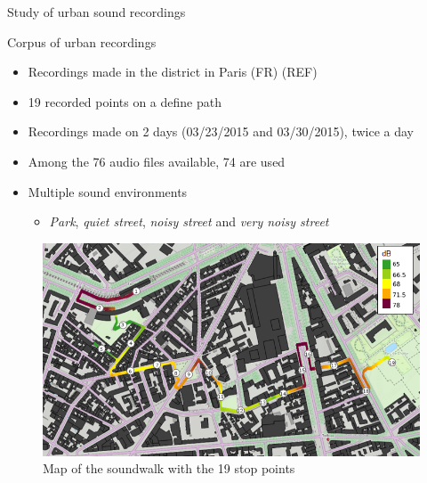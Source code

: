 \documentclass{beamer}
\begin{document}
\begin{frame}{Study of urban sound recordings}

\begin{block}{Corpus of urban recordings}
\begin{itemize}
	 \item Recordings made in the  district in Paris (FR) (REF)
	 \item 19 recorded points on a define path
	 \item Recordings made on 2 days (03/23/2015 and 03/30/2015), twice a day
	 \item Among the 76 audio files available, 74 are used
	 \item Multiple sound environments
	 \begin{itemize}
	 	\item \textit{Park}, \textit{quiet street}, \textit{noisy street} and \textit{very noisy street}
	 \end{itemize}
\end{itemize}
\end{block}

\begin{figure}[hbtp]
\centering
\includegraphics[width=.4\linewidth]{pictures/trajet_19pts.png}
\caption{Map of the soundwalk with the 19 stop points}
\end{figure}


\end{frame}

\end{document}
